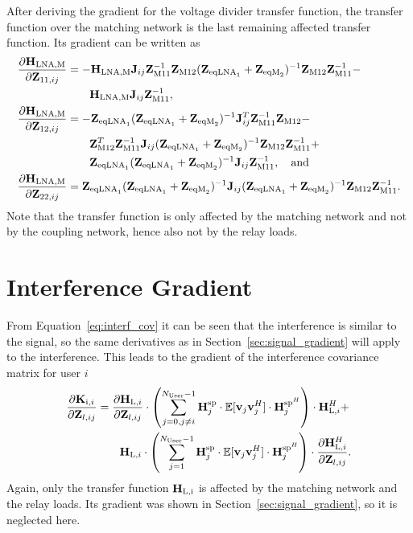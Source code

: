 After deriving the gradient for the voltage divider transfer function, the transfer function over the matching network is the last remaining affected transfer function.
Its gradient can be written as
\begin{align}
\label{eq:HLNAM_sig_grad}
\nonumber
\frac{\partial\mathbf{H}_\text{LNA,M}}{\partial\mathbf{Z}_{11,ij}}&=
	-\mathbf{H}_\text{LNA,M}\mathbf{J}_{ij}\mathbf{Z}_\text{M11}^{-1}\mathbf{Z}_\text{M12}
	(\mathbf{Z}_{\text{eqLNA}_1} + \mathbf{Z}_{\text{eqM}_2})^{-1}
	\mathbf{Z}_\text{M12}\mathbf{Z}_\text{M11}^{-1} -\\
&\qquad	\mathbf{H}_\text{LNA,M}\mathbf{J}_{ij}\mathbf{Z}_\text{M11}^{-1},\\\nonumber
\frac{\partial\mathbf{H}_\text{LNA,M}}{\partial\mathbf{Z}_{12,ij}}&=
	-\mathbf{Z}_{\text{eqLNA}_1}(\mathbf{Z}_{\text{eqLNA}_1} + \mathbf{Z}_{\text{eqM}_2})^{-1}
	\mathbf{J}_{ij}^T\mathbf{Z}_\text{M11}^{-1}\mathbf{Z}_\text{M12} - \\\nonumber
&\qquad	\mathbf{Z}_\text{M12}^T\mathbf{Z}_\text{M11}^{-1}\mathbf{J}_{ij}
	(\mathbf{Z}_{\text{eqLNA}_1} + \mathbf{Z}_{\text{eqM}_2})^{-1}
	\mathbf{Z}_\text{M12}\mathbf{Z}_\text{M11}^{-1} + \\
&\qquad	\mathbf{Z}_{\text{eqLNA}_1}(\mathbf{Z}_{\text{eqLNA}_1} + \mathbf{Z}_{\text{eqM}_2})^{-1}
	\mathbf{J}_{ij}\mathbf{Z}_\text{M11}^{-1},\quad\text{and}\\
\frac{\partial\mathbf{H}_\text{LNA,M}}{\partial\mathbf{Z}_{22,ij}}&=
	\mathbf{Z}_{\text{eqLNA}_1}(\mathbf{Z}_{\text{eqLNA}_1} + \mathbf{Z}_{\text{eqM}_2})^{-1}
	\mathbf{J}_{ij}(\mathbf{Z}_{\text{eqLNA}_1} + \mathbf{Z}_{\text{eqM}_2})^{-1}
	\mathbf{Z}_\text{M12}\mathbf{Z}_\text{M11}^{-1}.
\label{eq:HLNAM_sig_grad_22}
\end{align}
Note that the transfer function is only affected by the matching network and not by the coupling network, hence also not by the relay loads.

\section{Interference Gradient}
\label{sec:interf_gradient}

From Equation~\eqref{eq:interf_cov} it can be seen that the interference is similar to the signal, so the same derivatives as in Section~\ref{sec:signal_gradient} will apply to the interference.
This leads to the gradient of the interference covariance matrix for user $i$
\begin{align}
\label{eq:interf_gradient}\nonumber
\frac{\partial\mathbf{K}_{\text{i},i}}{\partial\mathbf{Z}_{l,ij}} &= 
	\frac{\partial\mathbf{H}_{\text{L,}i}}{\partial\mathbf{Z}_{l,ij}} \cdot
	\left(\sum_{j=0,j\neq i}^{N_\text{User}-1} 
	 \mathbf{H}_{j}^{\text{sp}} \cdot 
	\mathbb{E}[\mathbf{v}_{j}\mathbf{v}_{j}^H] \cdot 
	\mathbf{H}_{j}^{\text{sp}^H}\right) \cdot \mathbf{H}_{\text{L,}i}^H + \\
 &\qquad \mathbf{H}_{\text{L,}i} \cdot \left(\sum_{j=1}^{N_\text{User}-1} 
	\mathbf{H}_{j}^{\text{sp}} \cdot 
	\mathbb{E}[\mathbf{v}_{j}\mathbf{v}_{j}^H] \cdot 
	\mathbf{H}_{j}^{\text{sp}^H}\right) \cdot \frac{\partial\mathbf{H}_{\text{L,}i}^H}{\partial\mathbf{Z}_{l,ij}}.
\end{align}
Again, only the transfer function $\mathbf{H}_\text{L,i}$ is affected by the matching network and the relay loads.
Its gradient was shown in Section~\ref{sec:signal_gradient}, so it is neglected here.

